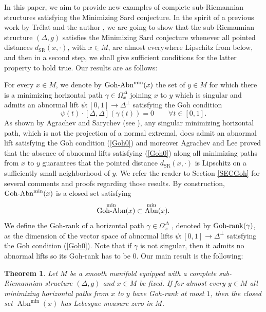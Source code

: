 \documentclass[JEP,XML,SOM,Unicode,NoFloatCountersInSection,published]{cedram}
\newcommand{\SR}{{\scriptscriptstyle\mathrm{SR}}}
\DeclareMathOperator{\Abn}{Abn}
\DeclareMathOperator{\GohAbn}{Goh\textup{-}Abn}
\DeclareMathOperator{\Gohrank}{Goh\textup{-}rank}
\newtheorem{theorem}{Theorem}[section]
\theoremstyle{definition}
\begin{document}
In this paper, we aim to provide new examples of complete sub-Riemannian structures satisfying the Minimizing Sard conjecture. In the spirit of a previous work by Trélat and the author \cite{rt05}, we are going to show that the sub-Riemannian structure $(\Delta,g)$ satisfies the Minimizing Sard conjecture whenever all pointed distances $d_{\SR}(x,\cdot)$, with $x\in M$, are almost everywhere Lipschitz from below, and then in a second step, we shall give sufficient conditions for the latter property to hold true. Our results are as follows:

For every $x\in M$, we denote by $\GohAbn^{\min}(x)$ the set of $y\in M$ for which there is a minimizing horizontal path $\gamma \in \Omega^{\Delta}_x$ joining $x$ to $y$ which is singular and admits an abnormal lift $\psi:[0,1] \to \Delta^{\perp}$ satisfying the Goh condition
\begin{equation}\label{Goh0}
\psi(t) \cdot [\Delta,\Delta](\gamma(t)) = 0 \qquad \forall t \in [0,1].
\end{equation}
As shown by Agrachev and Sarychev (see \cite{as96,as99}), any singular minimizing horizontal path, which is not the projection of a normal extremal, does admit an abnormal lift satisfying the Goh condition (\ref{Goh0}) and moreover Agrachev and Lee \cite{al09} proved that the absence of abnormal lifts satisfying (\ref{Goh0}) along all minimizing paths from $x$ to $y$ guarantees that the pointed distance $d_{\SR}(x,\cdot)$ is Lipschitz on a sufficiently small neighborhood of $y$. We refer the reader to Section \ref{SECGoh} for several comments and proofs regarding those results. By construction, $\GohAbn^{\min}(x)$ is a closed set satisfying
\[
\GohAbn^{\min}(x) \subset \Abn^{\min}(x).
\]
We define the Goh-rank of a horizontal path $\gamma \in \Omega^{\Delta}_x$ , denoted by $\Gohrank(\gamma)$, as the dimension of the vector space of abnormal lifts $\psi:[0,1] \to \Delta^{\perp}$ satisfying the Goh condition (\ref{Goh0}). Note that if $\gamma$ is not singular, then it admits no abnormal lifts so its Goh-rank has to be $0$. Our main result is the following:

\begin{theorem}\label{THM}
Let $M$ be a smooth manifold equipped with a complete sub-Riemannian structure $(\Delta,g)$ and $x\in M$ be fixed. If for almost every $y\in M$ all minimizing horizontal paths from $x$ to $y$ have Goh-rank at most $1$, then the closed set $\Abn^{\min}(x)$ has Lebesgue measure zero in $M$.
\end{theorem}
\end{document}
